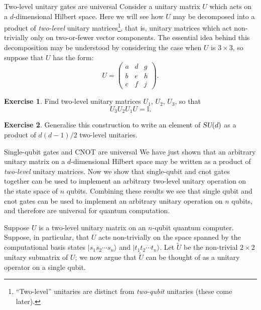 \documentclass[12pt,oneside]{amsart}
\makeatletter
\def\subsubsection{\@startsection{subsubsection}{3}%
  \z@{.5\linespacing\@plus.7\linespacing}{-.5em}%
  {\color{cgblue}\normalfont\sf\itshape}}
\theoremstyle{plain}%
\theoremstyle{definition}
\newtheorem{exercise}{\color{cgblue}Exercise}[section]
\theoremstyle{remark}
\makeatother
\begin{document}
\subsubsection{Two-level unitary gates are universal}
Consider a unitary matrix $U$ which acts on a $d$-dimensional Hilbert space. Here we will see how $U$ may be decomposed into a product of \emph{two-level} unitary matrices\footnote{``Two-level'' unitaries are distinct from \emph{two-qubit} unitaries (these come later).}, that is, unitary matrices which act non-trivially only on two-or-fewer vector components. The essential idea behind this decomposition may be understood by considering the case when $U$ is $3\times 3$, so suppose that $U$ has the form:
\begin{equation}
  U = \begin{pmatrix}
    a & d & g \\
    b & e & h \\
    c & f & j 
  \end{pmatrix}.
\end{equation}

\begin{exercise}
  Find two-level unitary matrices $U_1$, $U_2$, $U_3$, so that
  \begin{equation}
    U_3 U_2 U_1 U = \mathbb{I}.
  \end{equation}
\end{exercise} 

\begin{exercise}
  Generalise this construction to write an element of $\textsl{SU}(d)$ as a product of $d(d-1)/2$ two-level unitaries.
\end{exercise} 

\subsubsection{Single-qubit gates and CNOT are universal}
We have just shown that an arbitrary unitary matrix on a $d$-dimensional Hilbert space may be written as a product of \emph{two-level} unitary matrices. Now we show that single-qubit and {\sc cnot} gates together can be used to implement an arbitrary two-level unitary operation on the state space of $n$ qubits. Combining these results we see that single qubit and {\sc cnot} gates can be used to implement an arbitrary unitary operation on $n$ qubits, and therefore are universal for quantum computation.

Suppose $U$ is a two-level unitary matrix on an $n$-qubit quantum computer. Suppose, in particular, that $U$ acts non-trivially on the space spanned by the computational basis states $|s_1s_2\cdots s_n\rangle$ and $|t_1t_2\cdots t_n\rangle$. Let $\widetilde{U}$ be the non-trivial $2\times 2$ unitary submatrix of $U$; we now argue that $\widetilde{U}$ can be thought of as a unitary operator on a single qubit.
\end{document}
